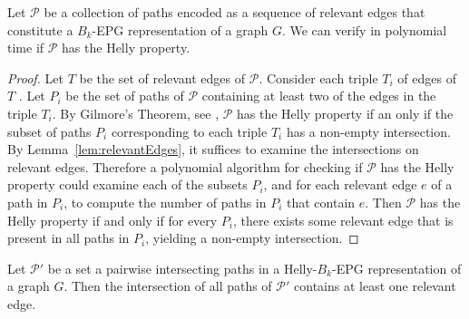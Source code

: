 \begin{lemma}\label{lem:verify3}
Let $\mathcal{P}$ be a collection of paths encoded as a sequence of relevant edges that constitute a  $B_k$-EPG representation of a graph $G$. We can verify in polynomial time if $\mathcal{P}$ has the Helly property.
\end{lemma}

\begin{proof}
Let $T$ be the set of relevant edges of $\mathcal{P}$. Consider each triple $T_i$ of edges of $T$ . Let $P_i$ be the set of paths of $\mathcal{P}$ containing at least two of the edges in the triple  $T_i$. By Gilmore's Theorem, see \cite{bergeDuchet1975}, $\mathcal{P}$ has the Helly property if an only if the subset of paths $P_i$  corresponding to each triple  $T_i$  has a non-empty intersection.  By Lemma~\ref{lem:relevantEdges}, it suffices to examine the intersections on relevant edges. Therefore a polynomial algorithm for checking if $\mathcal{P}$ has the Helly property could examine each of the subsets $P_i$, and for each relevant edge $e$ of a path in $P_i$, to compute the number of paths in $P_i$ that contain $e$. Then  $\mathcal{P}$ has the Helly property if and only if for every  $P_i$,  there exists some relevant edge that is present in all paths in $P_i$,  yielding a non-empty intersection.
 \end{proof}

\begin{corollary}\label{cor:comumAtodos}
Let ${\mathcal P'}$ be a set a pairwise intersecting paths in a Helly-$B_k$-EPG representation of a graph $G$. Then the intersection of all paths of  ${\mathcal P'}$ contains at least one relevant edge.
\end{corollary}

